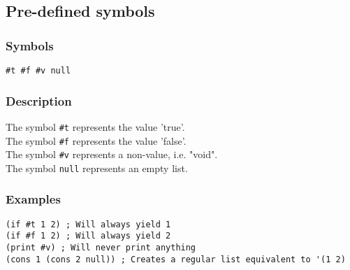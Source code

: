 \subsection{Pre-defined symbols}
\label{builtins/predefined-symbols}

\subsubsection{Symbols}
\begin{lstlisting}
#t #f #v null
\end{lstlisting}

\subsubsection*{Description}
The symbol \lstinline|#t| represents the value 'true'.\\
The symbol \lstinline|#f| represents the value 'false'.\\
The symbol \lstinline|#v| represents a non-value, i.e. "void".\\
The symbol \lstinline|null| represents an empty list.

\subsubsection{Examples}
\begin{lstlisting}
(if #t 1 2) ; Will always yield 1
(if #f 1 2) ; Will always yield 2
(print #v) ; Will never print anything
(cons 1 (cons 2 null)) ; Creates a regular list equivalent to '(1 2)
\end{lstlisting}
